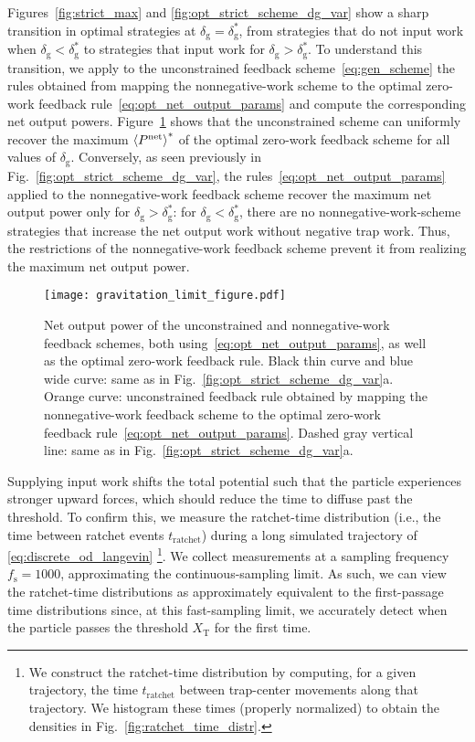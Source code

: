 \documentclass[%
reprint,
bibnotes, amsmath, amssymb, aps, pre,
 showkeys,
floatfix
]{revtex4-2}
\newcommand{\mrm}{\mathrm}
\newcommand{\dg}{\delta_{\mrm{g}}}
\newcommand{\fs}{f_{\mrm{s}}}
\newcommand{\epn}{\ev{P^{\mrm{net}}}}
\newcommand{\xT}{X_{\mrm{T}}}
\begin{document}
Figures~\ref{fig:strict_max} and \ref{fig:opt_strict_scheme_dg_var} show a sharp transition in optimal strategies at $\dg = \dg^{*}$, from strategies that do not input work when $\dg < \dg^{*}$ to strategies that input work for $\dg > \dg^{*}$. 
To understand this transition, we apply to the unconstrained feedback scheme~\eqref{eq:gen_scheme} the rules obtained from mapping the nonnegative-work scheme to the optimal zero-work feedback rule~\eqref{eq:opt_net_output_params} and compute the corresponding net output powers.
Figure~\ref{fig:gravitation_limits} shows that the unconstrained scheme can uniformly recover the maximum $\epn^{*}$ of the optimal zero-work feedback scheme for all values of $\dg$. 
Conversely, as seen previously in Fig.~\ref{fig:opt_strict_scheme_dg_var}, the rules~\eqref{eq:opt_net_output_params} applied to the nonnegative-work feedback scheme recover the maximum net output power only for $\dg > \dg^{*}$: for $\dg < \dg^{*}$, there are no nonnegative-work-scheme strategies that increase the net output work without negative trap work. 
Thus, the restrictions of the nonnegative-work feedback scheme prevent it from realizing the maximum net output power.

\begin{figure}
    \centering
    \texttt{[image: gravitation\_limit\_figure.pdf]}
    \caption{ 
    Net output power of the unconstrained and nonnegative-work feedback schemes, both using~\eqref{eq:opt_net_output_params}, as well as the optimal zero-work feedback rule. 
    Black thin curve and blue wide curve: same as in Fig.~\ref{fig:opt_strict_scheme_dg_var}a. 
    Orange curve: unconstrained feedback rule obtained by mapping the nonnegative-work feedback scheme to the optimal zero-work feedback rule~\eqref{eq:opt_net_output_params}.
    Dashed gray vertical line: same as in Fig.~\ref{fig:opt_strict_scheme_dg_var}a.
    }
    \label{fig:gravitation_limits}
\end{figure}

Supplying input work shifts the total potential such that the particle experiences stronger upward forces, which should reduce the time to diffuse past the threshold. 
To confirm this, we measure the ratchet-time distribution (i.e., the time between ratchet events $t_{\mathrm{ratchet}}$) during a long simulated trajectory of \eqref{eq:discrete_od_langevin}
\footnote{We construct the ratchet-time distribution by computing, for a given trajectory, the time $t_{\mathrm{ratchet}}$ between trap-center movements along that trajectory. We histogram these times (properly normalized) to obtain the densities in Fig.~\ref{fig:ratchet_time_distr}.}.
We collect measurements at a sampling frequency $\fs=1000$, approximating the continuous-sampling limit.
As such, we can view the ratchet-time distributions as approximately equivalent to the first-passage time distributions since, at this fast-sampling limit, we accurately detect when the particle passes the threshold $\xT$ for the first time.
\end{document}
